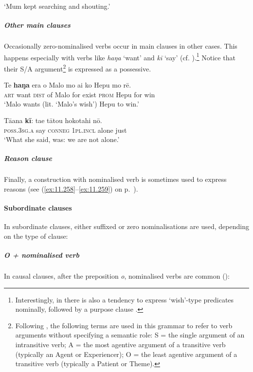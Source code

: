 \glt
‘Mum kept searching and shouting.’ \textstyleExampleref{[R236.082]} 
\z

\subparagraph{Other main clauses} Occasionally zero-nominalised verbs occur in main clauses in other cases. This happens especially with verbs like \textit{haŋa} ‘want’ and \textit{kī} ‘say’ (cf. ).\footnote{\label{fn:108}Interestingly, in  there is also a tendency to express ‘wish’-type predicates nominally, followed by a purpose clause \citep[459]{Bauer1993}.} Notice that their S/A argument\footnote{\label{fn:109}Following \citet{Comrie1978}, the following terms are used in this grammar to refer to verb arguments without specifying a semantic role: S = the single argument of an intransitive verb; A = the most agentive argument of a transitive verb (typically an Agent or Experiencer); O = the least agentive argument of a transitive verb (typically a Patient or Theme).} is expressed as a possessive.

\ea\label{ex:3.26}
\gll Te \textbf{haŋa} era o Malo mo ai ko Hepu mo rē. \\
\textsc{art} want \textsc{dist} of Malo for exist \textsc{prom} Hepu for win \\

\glt 
‘Malo wants (lit. ‘Malo’s wish’) Hepu to win.’ \textstyleExampleref{[R408.064]} 
\z

\ea\label{ex:3.27}
\gll Tā{\ꞌ}ana \textbf{kī}: ta{\ꞌ}e tātou hokotahi nō. \\
\textsc{poss.3sg.a} say \textsc{conneg} \textsc{1pl.incl} alone just \\

\glt
‘What she said, was: we are not alone.’ \textstyleExampleref{[R649.191]} 
\z

\subparagraph{Reason clause} Finally, a construction with nominalised verb is sometimes used to express reasons (see (\ref{ex:11.258}–\ref{ex:11.259}) on p.~\pageref{ex:11.258}).

\paragraph{Subordinate clauses}\label{sec:3.2.3.1.2} In subordinate clauses, either suffixed or zero nominalisations are used, depending on the type of clause:

\subparagraph{\textit{{\ꞌ}O} + nominalised verb} In causal clauses, after the preposition \textit{{\ꞌ}o}, nominalised verbs are common ():

